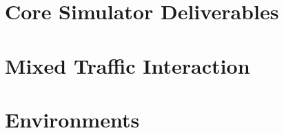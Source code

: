 \section{Core Simulator Deliverables}

\section{Mixed Traffic Interaction}

\section{Environments}






